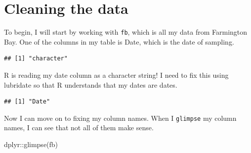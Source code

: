 \documentclass[
]{book}
\newenvironment{Shaded}{\begin{snugshade}}{\end{snugshade}}
\newcommand{\FunctionTok}[1]{\textcolor[rgb]{0.00,0.00,0.00}{#1}}
\newcommand{\NormalTok}[1]{#1}
\newcommand{\OtherTok}[1]{\textcolor[rgb]{0.56,0.35,0.01}{#1}}
\newcommand{\SpecialCharTok}[1]{\textcolor[rgb]{0.00,0.00,0.00}{#1}}
\begin{document}
\hypertarget{cleaning-the-data}{%
\section{Cleaning the data}\label{cleaning-the-data}}

To begin, I will start by working with \texttt{fb}, which is all my data from Farmington Bay. One of the columns in my table is Date, which is the date of sampling.

\begin{Shaded}
\end{Shaded}

\begin{verbatim}
## [1] "character"
\end{verbatim}

R is reading my date column as a character string! I need to fix this using lubridate so that R understands that my dates are dates.

\begin{Shaded}
\end{Shaded}

\begin{verbatim}
## [1] "Date"
\end{verbatim}

Now I can move on to fixing my column names. When I \texttt{glimpse} my column names, I can see that not all of them make sense.

\begin{Shaded}
\begin{Highlighting}[]
\NormalTok{dplyr}\SpecialCharTok{::}\FunctionTok{glimpse}\NormalTok{(fb)}
\end{Highlighting}
\end{Shaded}
\end{document}
